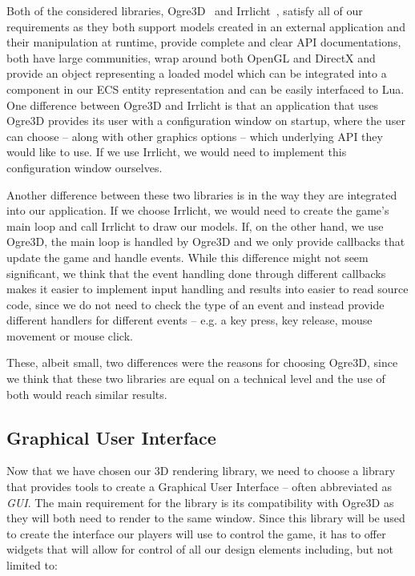 Both of the considered libraries, Ogre3D~\cite{Ogre3D} and Irrlicht~\cite{Irrlicht}, satisfy all of our requirements as they both
support models created in an external application and their manipulation at runtime, provide complete and clear API documentations,
both have large communities, wrap around both OpenGL and DirectX and provide an object representing a loaded model which can be
integrated into a component in our ECS entity representation and can be easily interfaced to Lua. One difference between Ogre3D and Irrlicht
is that an application that uses Ogre3D provides its user with a configuration window on startup, where the user can choose -- along with
other graphics options -- which underlying API they would like to use. If we use Irrlicht, we would need to implement this configuration
window ourselves.

Another difference between these two libraries is in the way they are integrated into our application. If we choose Irrlicht, we would need
to create the game's main loop and call Irrlicht to draw our models. If, on the other hand, we use Ogre3D, the main loop is handled by Ogre3D
and we only provide callbacks that update the game and handle events. While this difference might not seem significant, we think that
the event handling done through different callbacks makes it easier to implement input handling and results into easier to read source
code, since we do not need to check the type of an event and instead provide different handlers for different events -- e.g.
a key press, key release, mouse movement or mouse click.

These, albeit small, two differences were the reasons for choosing Ogre3D, since we think that these two libraries are equal
on a technical level and the use of both would reach similar results.

\subsection{Graphical User Interface}

Now that we have chosen our 3D rendering library, we need to choose a library that provides tools to create a Graphical User Interface 
-- often abbreviated as \emph{GUI}. The main requirement for the library is its compatibility with Ogre3D as they will both need to render
to the same window. Since this library will be used to create the interface our players will use to control the game,
it has to offer widgets that will allow for control of all our design elements including, but not limited to:

